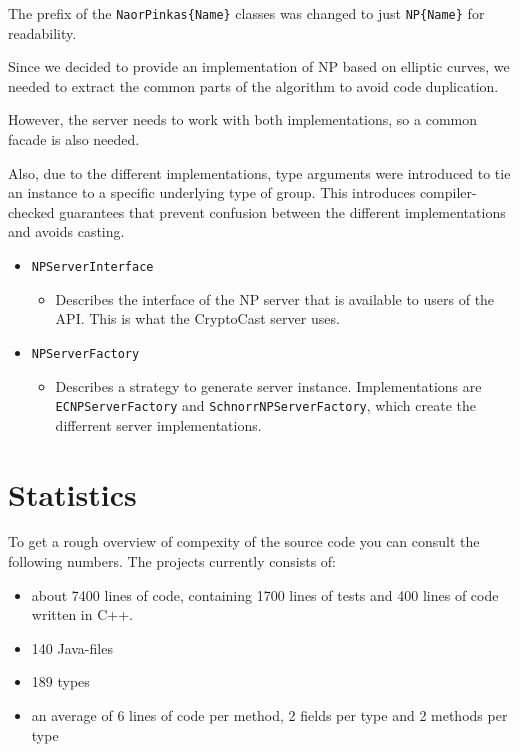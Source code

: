 \documentclass[a4paper,10pt]{scrartcl}
\begin{document}
The prefix of the \lstinline|NaorPinkas{Name}| classes was changed to just \lstinline|NP{Name}| for readability.

Since we decided to provide an implementation of NP based on elliptic curves, we needed to extract
the common parts of the algorithm to avoid code duplication.

However, the server needs to work with both implementations, so a common facade is also needed.

Also, due to the different implementations, type arguments were introduced to tie an instance
to a specific underlying type of group. This introduces compiler-checked guarantees that prevent
confusion between the different implementations and avoids casting.

\begin{itemize}
  \item \lstinline|NPServerInterface|
  \begin{itemize}
    \item Describes the interface of the NP server that is available to users of the API.
          This is what the CryptoCast server uses.
  \end{itemize}

  \item \lstinline|NPServerFactory|
  \begin{itemize}
    \item Describes a strategy to generate server instance. Implementations are
          \lstinline|ECNPServerFactory| and \lstinline|SchnorrNPServerFactory|, which
          create the differrent server implementations.
  \end{itemize}
\end{itemize}

\section{Statistics}
To get a rough overview of compexity of the source code you can consult the following numbers.
The projects currently consists of:
\begin{itemize}
    \item about 7400 lines of code, containing 1700 lines of tests and 400 lines of code written in C++.
    \item 140 Java-files
    \item 189 types
    \item an average of 6 lines of code per method, 2 fields per type and 2 methods per type
\end{itemize}
\end{document}
